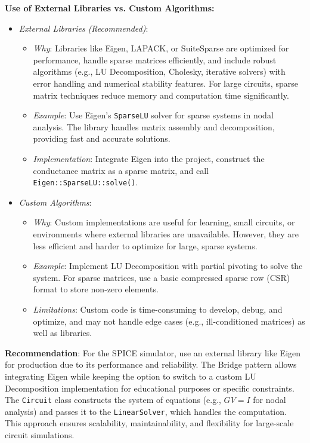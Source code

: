 \documentclass{article}
\begin{document}
\textbf{Use of External Libraries vs. Custom Algorithms:}
\begin{itemize}
    \item \textit{External Libraries (Recommended)}:
    \begin{itemize}
        \item \textit{Why}: Libraries like Eigen, LAPACK, or SuiteSparse are optimized for performance, handle sparse matrices efficiently, and include robust algorithms (e.g., LU Decomposition, Cholesky, iterative solvers) with error handling and numerical stability features. For large circuits, sparse matrix techniques reduce memory and computation time significantly.
        \item \textit{Example}: Use Eigen’s \texttt{SparseLU} solver for sparse systems in nodal analysis. The library handles matrix assembly and decomposition, providing fast and accurate solutions.
        \item \textit{Implementation}: Integrate Eigen into the project, construct the conductance matrix as a sparse matrix, and call \texttt{Eigen::SparseLU::solve()}.
    \end{itemize}
    \item \textit{Custom Algorithms}:
    \begin{itemize}
        \item \textit{Why}: Custom implementations are useful for learning, small circuits, or environments where external libraries are unavailable. However, they are less efficient and harder to optimize for large, sparse systems.
        \item \textit{Example}: Implement LU Decomposition with partial pivoting to solve the system. For sparse matrices, use a basic compressed sparse row (CSR) format to store non-zero elements.
        \item \textit{Limitations}: Custom code is time-consuming to develop, debug, and optimize, and may not handle edge cases (e.g., ill-conditioned matrices) as well as libraries.
    \end{itemize}
\end{itemize}

\textbf{Recommendation}: For the SPICE simulator, use an external library like Eigen for production due to its performance and reliability. The Bridge pattern allows integrating Eigen while keeping the option to switch to a custom LU Decomposition implementation for educational purposes or specific constraints. The \texttt{Circuit} class constructs the system of equations (e.g., \( GV = I \) for nodal analysis) and passes it to the \texttt{LinearSolver}, which handles the computation. This approach ensures scalability, maintainability, and flexibility for large-scale circuit simulations.
\end{document}

